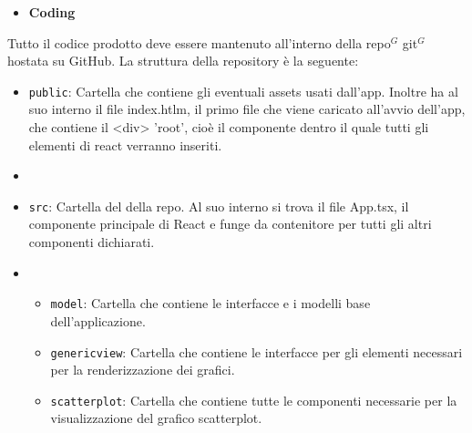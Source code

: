 \begin{itemize}
    \item \textbf{Coding}
\end{itemize}
Tutto il codice prodotto deve essere mantenuto all'interno della repo$^G$  git$^G$ hostata su GitHub.
La struttura della repository è la seguente:
\begin{itemize}
    \item \texttt{public}: Cartella che contiene gli eventuali assets usati dall'app. Inoltre ha al suo interno il file index.htlm, il primo file che viene caricato all'avvio dell'app, che contiene il <div> 'root', cioè il componente dentro il quale tutti gli elementi di react verranno inseriti.
    \item \item \texttt{src}: Cartella del della repo. Al suo interno si trova il file App.tsx, il componente principale di React e funge da contenitore per tutti gli altri componenti dichiarati.
    \item \begin{itemize}
        \item \texttt{model}: Cartella che contiene le interfacce e i modelli base dell'applicazione.
        \item \texttt{genericview}: Cartella che contiene le interfacce per gli elementi necessari per la renderizzazione dei grafici.
        \item \texttt{scatterplot}: Cartella che contiene tutte le componenti necessarie per la visualizzazione del grafico scatterplot.
    \end{itemize}
\end{itemize}


